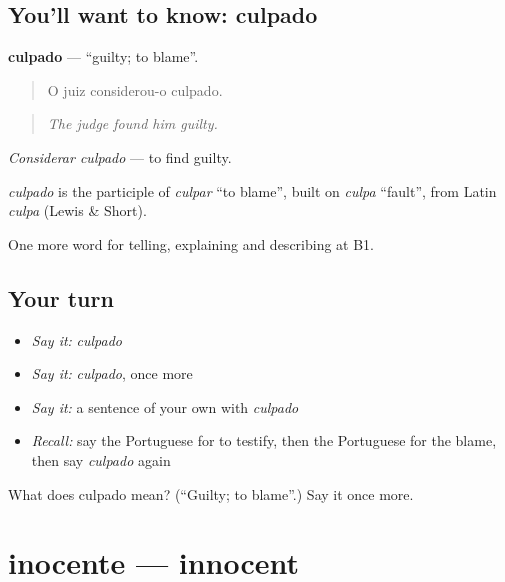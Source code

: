 \subsection*{You'll want to know: culpado}
\textbf{culpado} — \textquotedblleft{}guilty; to blame\textquotedblright{}.

\begin{quote}
O juiz considerou-o culpado.
\end{quote}

\begin{quote}
\emph{The judge found him guilty.}
\end{quote}

\emph{Considerar culpado} — to find guilty.

\begin{cousinweb}
\emph{culpado} is the participle of \emph{culpar} \textquotedblleft{}to blame\textquotedblright{}, built on \emph{culpa} \textquotedblleft{}fault\textquotedblright{}, from Latin \emph{culpa} (Lewis \& Short).
\end{cousinweb}

\begin{grammarlens}[title={What you've built}]
One more word for telling, explaining and describing at B1.
\end{grammarlens}

\subsection*{Your turn}
\begin{itemize}
\raggedright
  \item \emph{Say it:} \emph{culpado}
  \item \emph{Say it:} \emph{culpado}, once more
  \item \emph{Say it:} a sentence of your own with \emph{culpado}
  \item \emph{Recall:} say the Portuguese for to testify, then the Portuguese for the blame, then say \emph{culpado} again
\end{itemize}

\begin{tcolorbox}[breakable,colback=teal!4,colframe=teal!35!black,title={Before you move on}]
What does culpado mean? (\textquotedblleft{}Guilty; to blame\textquotedblright{}.) Say it once more.
\end{tcolorbox}
\section[inocente]{inocente — innocent}


